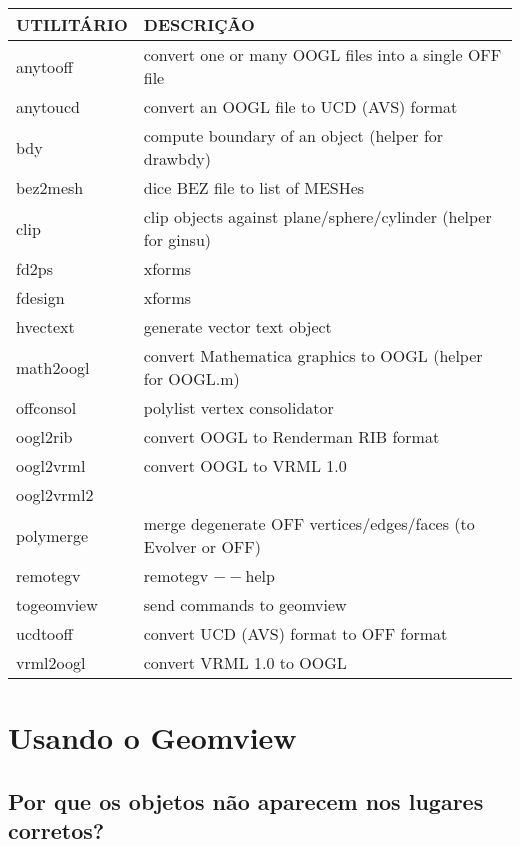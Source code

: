 \documentclass[12pt,a4paper]{article}
\begin{document}
        \begin{center}
        \begin{tabular}{|l|p{8cm}|}
        \hline
        UTILIT\'ARIO & DESCRI\c{C}\~AO \\ \hline
        anytooff & convert one or many OOGL files into a single OFF file \\ \hline
        anytoucd & convert an OOGL file to UCD (AVS) format \\ \hline
        bdy & compute boundary of an object (helper for drawbdy) \\ \hline
        bez2mesh & dice BEZ file to list of MESHes \\ \hline
        clip & clip objects against plane/sphere/cylinder (helper for ginsu) \\ \hline
        fd2ps & xforms \\ \hline
        fdesign & xforms \\ \hline
        hvectext & generate vector text object \\ \hline
        math2oogl & convert Mathematica graphics to OOGL (helper for OOGL.m) \\ \hline
        offconsol & polylist vertex consolidator \\ \hline
        oogl2rib & convert OOGL to Renderman RIB format \\ \hline
        oogl2vrml & convert OOGL to VRML 1.0 \\ \hline
        oogl2vrml2 &  \\ \hline
        polymerge & merge degenerate OFF vertices/edges/faces (to Evolver or OFF) \\ \hline
        remotegv &  remotegv $--$help \\ \hline
        togeomview & send commands to geomview \\ \hline
        ucdtooff & convert UCD (AVS) format to OFF format \\ \hline
        vrml2oogl & convert VRML 1.0 to OOGL \\ \hline
        \end{tabular}
	\end{center}

\section{Usando o Geomview}

    \subsection{Por que os objetos n\~ao aparecem nos lugares corretos?}
\end{document}
